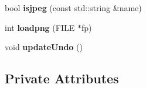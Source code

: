 \begin{DoxyCompactItemize}
\item 
\hypertarget{classMIAApp_aca628e45e29bc68fa7a9829d4bf9ce43}{bool {\bfseries isjpeg} (const std\-::string \&name)}\label{classMIAApp_aca628e45e29bc68fa7a9829d4bf9ce43}

\item 
\hypertarget{classMIAApp_a14dde1e19c341b5558f9c80150f24138}{int {\bfseries loadpng} (F\-I\-L\-E $\ast$fp)}\label{classMIAApp_a14dde1e19c341b5558f9c80150f24138}

\item 
\hypertarget{classMIAApp_a730fc463e33ece951f353f6a746b5317}{void {\bfseries update\-Undo} ()}\label{classMIAApp_a730fc463e33ece951f353f6a746b5317}

\end{DoxyCompactItemize}
\subsection*{Private Attributes}
